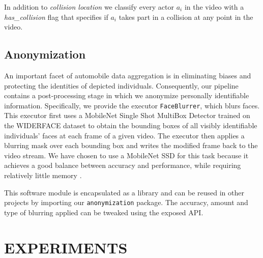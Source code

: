 \documentclass[letterpaper, 10 pt, conference]{ieeeconf}
\begin{document}
In addition to \textit{collision location} we classify every actor $a_i$ in the video with a \textit{has\_collision} flag that specifies if $a_i$ takes part in a collision at any point in the video.

\subsection{Anonymization}
An important facet of automobile data aggregation is in eliminating biases and protecting the identities of depicted individuals. Consequently, our pipeline contains a post-processing stage in which we anonymize personally identifiable information. Specifically, we provide the executor \texttt{FaceBlurrer}, which blurs faces. This executor first uses a MobileNet Single Shot MultiBox Detector \cite{yixuan_h_y_hu_2021_4642275} trained on the WIDERFACE dataset \cite{yang2016wider} to obtain the bounding boxes of all visibly identifiable individuals' faces at each frame of a given video. The executor then applies a blurring mask over each bounding box and writes the modified frame back to the video stream. We have chosen to use a MobileNet SSD for this task because it achieves a good balance between accuracy and performance, while requiring relatively little memory \cite{yixuan_h_y_hu_2021_4642275}.

This software module is encapsulated as a library and can be reused in other projects by importing our \texttt{anonymization} package. The accuracy, amount and type of blurring applied can be tweaked using the exposed API.

\section{EXPERIMENTS}
\end{document}
